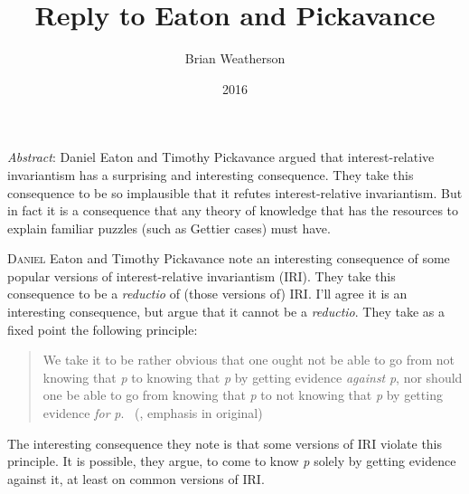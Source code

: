 \documentclass[
  11pt,
  letterpaper,
  DIV=11,
  numbers=noendperiod,
  twoside]{scrartcl}
\title{Reply to Eaton and Pickavance}
\author{Brian Weatherson}
\date{2016}
\renewenvironment{abstract}
 {\vspace{-1.25cm}
 \quotation\small\noindent\emph{Abstract}:}
 {\endquotation}
\renewenvironment{abstract}
 {\quotation\small\noindent\emph{Abstract}:}
 {\endquotation\vspace{-0.02cm}}
\begin{document}
\maketitle
\begin{abstract}
Daniel Eaton and Timothy Pickavance argued that interest-relative
invariantism has a surprising and interesting consequence. They take
this consequence to be so implausible that it refutes interest-relative
invariantism. But in fact it is a consequence that any theory of
knowledge that has the resources to explain familiar puzzles (such as
Gettier cases) must have.
\end{abstract}


\lettrine{D}{aniel} Eaton and Timothy Pickavance note an interesting
consequence of some popular versions of interest-relative invariantism
(IRI). They take this consequence to be a \emph{reductio} of (those
versions of) IRI. I'll agree it is an interesting consequence, but argue
that it cannot be a \emph{reductio}. They take as a fixed point the
following principle:

\begin{quote}
We take it to be rather obvious that one ought not be able to go from
not knowing that \emph{p} to knowing that \emph{p} by getting evidence
\emph{against} \emph{p}, nor should one be able to go from knowing that
\emph{p} to not knowing that \emph{p} by getting evidence \emph{for}
\emph{p}. ~(, emphasis in original)
\end{quote}

The interesting consequence they note is that some versions of IRI
violate this principle. It is possible, they argue, to come to know
\emph{p} solely by getting evidence against it, at least on common
versions of IRI.
\end{document}

